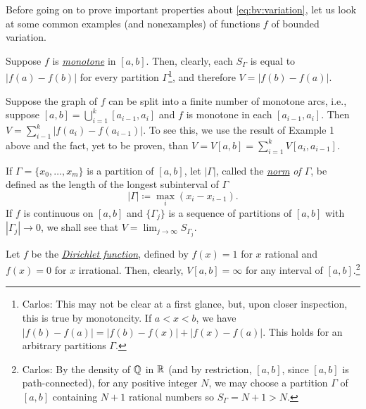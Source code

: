 Before going on to prove important properties about
\eqref{eq:bv:variation}, let us look at some common examples (and
nonexamples) of functions $f$ of bounded variation.

\begin{example}
Suppose $f$ is
\href{https://en.wikipedia.org/wiki/Monotonic_function}{\emph{monotone}} in
$[a,b]$. Then, clearly, each $S_\Gamma$ is equal to $|f(a)-f(b)|$ for every
partition $\Gamma$\footnote{Carlos: This may not be clear at
  a first glance, but, upon closer inspection, this is true by
  monotoncity. If $a<x<b$, we have
  $|f(b)-f(a)|=|f(b)-f(x)|+|f(x)-f(a)|$. This holds for an arbitrary
  partitions $\Gamma$.}, and therefore $V=|f(b)-f(a)|$.
\end{example}
\begin{example}
Suppose the graph of $f$ can be split into a finite number of monotone
arcs, i.e., suppose $[a,b]=\bigcup_{i=1}^k [a_{i-1},a_i]$ and $f$ is
monotone in each $[a_{i-1},a_i]$. Then
$V=\sum_{i-1}^k|f(a_i)-f(a_{i-1})|$. To see this, we use the result of
Example 1 above and the fact, yet to be proven, than $V=V[a,b]=\sum_{i=1}^k
V[a_i,a_{i-1}]$.
\end{example}

If $\Gamma=\{x_0,\dotsc,x_m\}$ is a partition of $[a,b]$, let $|\Gamma|$,
called the
\href{https://en.wikipedia.org/wiki/Partition_of_an_interval#Norm_of_a_partition}{\emph{norm}}
\emph{of $\Gamma$}, be defined as the length of the longest subinterval of
$\Gamma$
\begin{equation}
\label{eq:bv:partition-norm}
|\Gamma|\coloneqq\max_{i}(x_i-x_{i-1}).
\end{equation}
If $f$ is continuous on $[a,b]$ and $\{\Gamma_j\}$ is a sequence of
partitions of $[a,b]$ with $|\Gamma_j|\to 0$, we shall see that
$V=\lim_{j\to\infty} S_{\Gamma_j}$.

\begin{example}
Let $f$ be the
\href{https://en.wikipedia.org/wiki/Dirichlet_function}{\emph{Dirichlet
    function}}, defined by $f(x)=1$ for $x$ rational and $f(x)=0$ for $x$
irrational. Then, clearly, $V[a,b]=\infty$ for any interval of
$[a,b]$.\footnote{Carlos: By the density of $\mathbb{Q}$ in $\mathbb{R}$ (and by
  restriction, $[a,b]$, since $[a,b]$ is path-connected), for any
  positive integer $N$, we may choose a partition $\Gamma$ of $[a,b]$
  containing $N+1$ rational numbers so $S_\Gamma=N+1>N$.}
\end{example}

